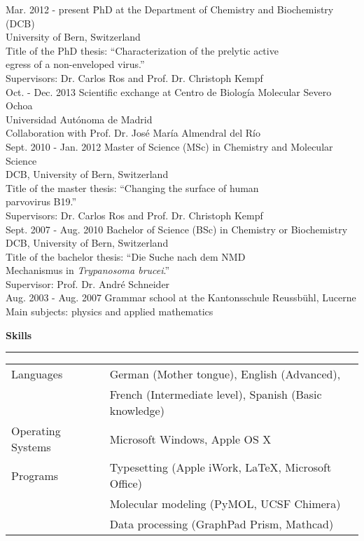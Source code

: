 \normalsize
\vspace{-0.7cm}
\begin{tabbing}
Mar. 2012 - present \hspace*{0.9cm} \= PhD at the Department of Chemistry and Biochemistry (DCB) \\ 
\> University of Bern, Switzerland  \\
\> Title of the PhD thesis: ``Characterization of the prelytic
active \\ 
\> egress of a non-enveloped virus.'' \\
\> Supervisors: Dr. Carlos Ros and Prof. Dr. Christoph Kempf \\ [0.3cm]
Oct. - Dec. 2013 \> Scientific exchange at Centro de Biología Molecular Severo Ochoa \\
\> Universidad Autónoma de Madrid \\
\> Collaboration with Prof. Dr. José María Almendral del Río \\ [0.3cm]
Sept. 2010 - Jan. 2012 \> Master of Science (MSc) in Chemistry and Molecular Science \\
\> DCB, University of Bern, Switzerland  \\
\> Title of the master thesis: ``Changing the surface of human \\ \> parvovirus B19.'' \\
\> Supervisors: Dr. Carlos Ros and Prof. Dr. Christoph Kempf \\ [0.3cm]
Sept. 2007 - Aug. 2010 \> Bachelor of Science (BSc) in Chemistry or Biochemistry \\
\> DCB, University of Bern, Switzerland  \\
\> Title of the bachelor thesis: ``Die Suche nach dem NMD \\
\> Mechanismus in \textit{Trypanosoma brucei}.'' \\
\> Supervisor: Prof. Dr. André Schneider \\ [0.3cm]
Aug. 2003 - Aug. 2007 \> Grammar school at the Kantonsschule Reussbühl, Lucerne \\
\> Main subjects: physics and applied mathematics

\end{tabbing}

\clearpage
\vspace{-8 cm}
\large
\textbf{Skills}
\noindent\rule[3mm]{\linewidth}{1pt}

\normalsize
\vspace{-0.2cm}
\begin{tabular}{p{4cm} l}
Languages & German (Mother tongue), English (Advanced), \\ 
& French (Intermediate level), Spanish (Basic knowledge) \\ [0.15 cm]
Operating Systems & Microsoft Windows, Apple OS X \\ [0.15cm]
Programs & Typesetting (Apple iWork, \LaTeX, Microsoft Office) \\
& Molecular modeling (PyMOL, UCSF Chimera)\\
& Data processing (GraphPad Prism, Mathcad)
\end{tabular}

